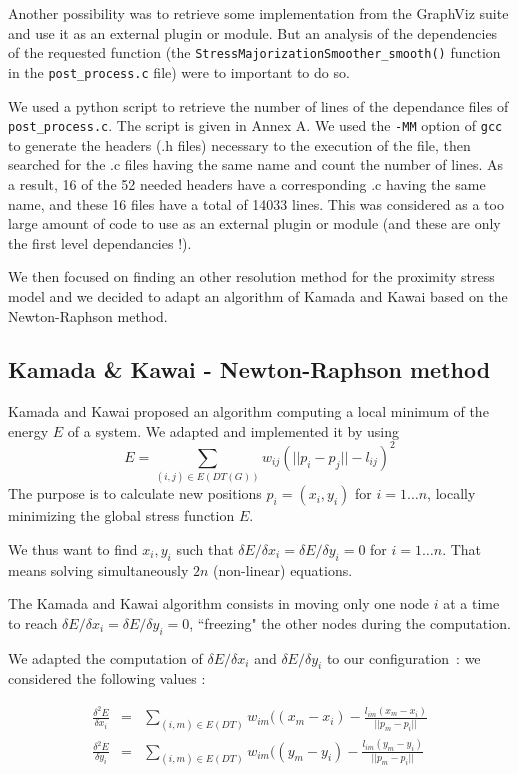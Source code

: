 \documentclass[12pt]{report}
\begin{document}
\bigskip
Another possibility was to retrieve some implementation from the GraphViz suite and use it as an external plugin or module. 
But an analysis of the dependencies of the requested function (the \texttt{StressMajorizationSmoother\_smooth()} function in the \texttt{post\_process.c} file) were to important to do so.

We used a python script to retrieve the number of lines of the dependance files of \texttt{post\_process.c}. The script is given in Annex A. We used the \texttt{-MM} option of \texttt{gcc} to generate the headers (.h files) necessary to the execution of the file, then searched for the .c files having the same name and count the number of lines. As a result, 16 of the 52 needed headers have a corresponding .c having the same name, and these 16 files have a total of 14033 lines.
This was considered as a too large amount of code to use as an external plugin or module (and these are only the first level dependancies !).

\bigskip
We then focused on finding an other resolution method for the proximity stress model and we decided to adapt an algorithm of Kamada and Kawai based on the Newton-Raphson method.

\subsection{Kamada \& Kawai - Newton-Raphson method}

Kamada and Kawai \cite{Kamada89} proposed an algorithm computing a local minimum of the energy $E$ of a system. We adapted and implemented it by using 
\[ E = \sum_{(i,j) \in E(DT(G))} w_{ij}(||p_i - p_j|| - l_{ij})^2 \]
The purpose is to calculate new positions $p_i = (x_i, y_i)$ for $i = 1 \ldots n$, locally minimizing the global stress function $E$. 

We thus want to find $x_i, y_i$ such that $\delta E / \delta x_i = \delta E / \delta y_i = 0$ for $i = 1 \ldots n$. That means solving simultaneously $2n$ (non-linear) equations.

\bigskip
The Kamada and Kawai algorithm consists in moving only one node $i$ at a time to reach $\delta E / \delta x_i = \delta E / \delta y_i = 0$, ``freezing" the other nodes during the computation.

We adapted the computation of $\delta E / \delta x_i$ and $\delta E / \delta y_i$ to our configuration~: we considered the following values :

\begin{eqnarray*}
\frac{\delta^2 E}{\delta x_i}  & = & \sum_{(i,m) \in E(DT)} w_{im} ( (x_m - x_i) - \frac{l_{im} (x_m - x_i)}{||p_m - p_i||} \\
\frac{\delta^2 E}{\delta y_i}  & = & \sum_{(i,m) \in E(DT)} w_{im} ( (y_m - y_i) - \frac{l_{im} (y_m - y_i)}{||p_m - p_i||}
\end{eqnarray*}
 
\end{document}
